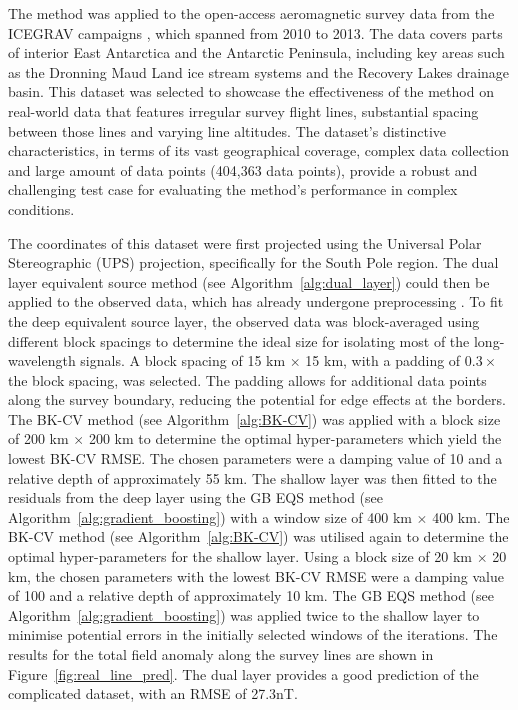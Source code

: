 The method was applied to the open-access aeromagnetic survey data from the ICEGRAV campaigns \citep{ICEGRAV_data}, which spanned from 2010 to 2013. The data covers parts of interior East Antarctica and the Antarctic Peninsula, including key areas such as the Dronning Maud Land ice stream systems and the Recovery Lakes drainage basin. This dataset was selected to showcase the effectiveness of the method on real-world data that features irregular survey flight lines, substantial spacing between those lines and varying line altitudes. The dataset’s distinctive characteristics, in terms of its vast geographical coverage, complex data collection and large amount of data points (404,363 data points), provide a robust and challenging test case for evaluating the method's performance in complex conditions.

The coordinates of this dataset were first projected using the Universal Polar Stereographic (UPS) projection, specifically for the South Pole region. The dual layer equivalent source method (see Algorithm~\ref{alg:dual_layer}) could then be applied to the observed data, which has already undergone preprocessing \citep{ICEGRAV_data}. To fit the deep equivalent source layer, the observed data was block-averaged using different block spacings to determine the ideal size for isolating most of the long-wavelength signals. A block spacing of 15 km $\times$ 15 km, with a padding of $ 0.3 \times $ the block spacing, was selected. The padding allows for additional data points along the survey boundary, reducing the potential for edge effects at the borders. The BK-CV method (see Algorithm~\ref{alg:BK-CV}) was applied with a block size of 200 km $\times$ 200 km to determine the optimal hyper-parameters which yield the lowest BK-CV RMSE. The chosen parameters were a damping value of 10 and a relative depth of approximately 55 km. The shallow layer was then fitted to the residuals from the deep layer using the GB EQS method (see Algorithm~\ref{alg:gradient_boosting}) with a window size of 400 km $\times$ 400 km. The BK-CV method (see Algorithm~\ref{alg:BK-CV}) was utilised again to determine the optimal hyper-parameters for the shallow layer. Using a block size of 20 km $\times$ 20 km, the chosen parameters with the lowest BK-CV RMSE were a damping value of 100 and a relative depth of approximately 10 km. The GB EQS method (see Algorithm~\ref{alg:gradient_boosting}) was applied twice to the shallow layer to minimise potential errors in the initially selected windows of the iterations. The results for the total field anomaly along the survey lines are shown in Figure~\ref{fig:real_line_pred}. The dual layer provides a good prediction of the complicated dataset, with an RMSE of 27.3nT.


